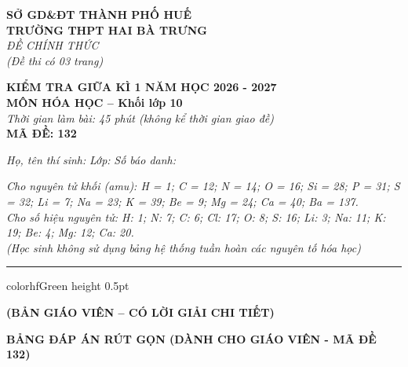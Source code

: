 \documentclass[11pt,a4paper]{article}
\begin{document}
\begin{minipage}[t]{0.48\textwidth}
\textbf{SỞ GD\&ĐT THÀNH PHỐ HUẾ}\\
\textbf{TRƯỜNG THPT HAI BÀ TRƯNG}\\
\textit{ĐỀ CHÍNH THỨC}\\
\textit{(Đề thi có 03 trang)}
\end{minipage}
\hfill
\begin{minipage}[t]{0.48\textwidth}
\raggedleft
\textbf{\color{hfRed}KIỂM TRA GIỮA KÌ 1 NĂM HỌC 2026 - 2027}\\
\textbf{MÔN HÓA HỌC -- Khối lớp 10}\\
\textit{Thời gian làm bài: 45 phút (không kể thời gian giao đề)}\\
\textbf{MÃ ĐỀ: 132}
\end{minipage}

\vspace{4pt}
\noindent
\textit{Họ, tên thí sinh:} \dotfill \textit{Lớp:} \dotfill \textit{Số báo danh:} \dotfill

\vspace{3pt}
\noindent
\textit{\footnotesize Cho nguyên tử khối (amu): H = 1; C = 12; N = 14; O = 16; Si = 28; P = 31; S = 32; Li = 7; Na = 23; K = 39; Be = 9; Mg = 24; Ca = 40; Ba = 137.\\
Cho số hiệu nguyên tử: H: 1; N: 7; C: 6; Cl: 17; O: 8; S: 16; Li: 3; Na: 11; K: 19; Be: 4; Mg: 12; Ca: 20.\\
(Học sinh không sử dụng bảng hệ thống tuần hoàn các nguyên tố hóa học)}

\vspace{3pt}
\hrule color{hfGreen} height 0.5pt

\vspace{4pt}
\begin{center}
\textbf{\color{hfRed}\large (BẢN GIÁO VIÊN -- CÓ LỜI GIẢI CHI TIẾT)}
\end{center}

\vspace{2pt}
\begin{center}
{\color{hfRed}\textbf{\large BẢNG ĐÁP ÁN RÚT GỌN (DÀNH CHO GIÁO VIÊN - MÃ ĐỀ 132)}}
\end{center}
\end{document}
